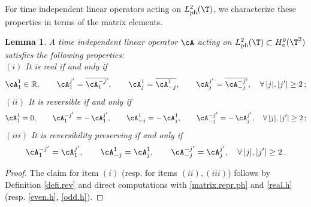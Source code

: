 \documentclass[a4paper,reqno,10pt]{article}
\newtheorem{lem}{Lemma}[section]
\begin{document}
For time independent linear operators acting on $L_{\rm ph}^2(\T)$, we characterize these properties in terms of the matrix elements.
\begin{lem}\label{prop.matrix.revreal}
	A time independent linear operator $\cA$ acting on  $L_{\rm ph}^2(\T)\subset H_{\circ}^{0}(\T^2)$ satisfies the following properties:
	\\[1mm]
	\noindent $(i)$ It is real if and only if
    \[
\cA_{1}^{1}\in\mathbb{R},\qquad
\cA_{1}^{j'}=\overline{\cA_{1}^{-j'}},\qquad
\cA_{j}^{1}=\overline{\cA_{-j}^{1}},\qquad
\cA_{j}^{j'}=\overline{\cA_{-j}^{-j'}},\quad \forall\,|j|,|j'|\ge2 \,;
\]
    \noindent $(ii)$  It is reversible if and only if
\[
\cA_{1}^{1}=0, \qquad
\cA_{1}^{-j'}= -\,\cA_{1}^{j'}, \qquad
\cA_{-j}^{1}= -\,\cA_{j}^{1}, \qquad
\cA_{-j}^{-j'}= -\,\cA_{j}^{j'},
\quad \forall\, |j|,|j'|\geq 2 \,;
\]
	\noindent $(iii)$ It is reversibility preserving if and only if
\[
\cA_{1}^{-j'}=\cA_{1}^{j'}, \qquad
\cA_{-j}^{1}=\cA_{j}^{1}, \qquad
\cA_{-j}^{-j'}=\cA_{j}^{j'},
\quad \forall\,|j|,|j'|\ge 2 \,.
\]
\end{lem}
\begin{proof}
    The claim for item $(i)$ (resp. for items $(ii),(iii)$) follows by Definition \ref{defi.rev} and direct computations with \eqref{matrix.repr.ph} and \eqref{real.h} (resp. \eqref{even.h}, \eqref{odd.h}).
\end{proof}
\end{document}
